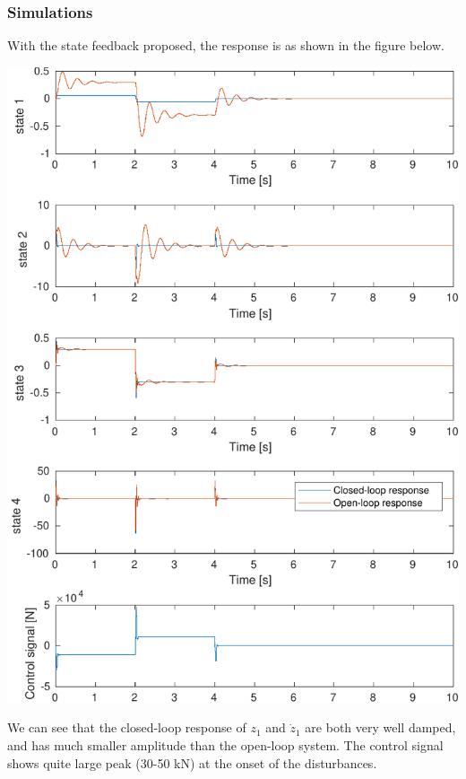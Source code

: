\documentclass[a4paper]{scrartcl}
\begin{document}
\subsubsection*{Simulations}
\label{sec-3-2-5}
With the state feedback proposed, the response is as shown in the figure below.
\begin{center}
\includegraphics[width=\linewidth]{../matlab/active-suspension-sim-crop}
\end{center}
We can see that the closed-loop response of \(z_1\) and \(\dot{z}_1\) are both very well damped, and has much smaller amplitude than the open-loop system. The control signal shows quite large peak (30-50 kN) at the onset of the disturbances. 
\end{document}
